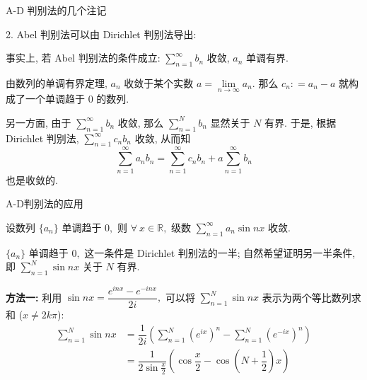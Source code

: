 \begin{frame}{A-D 判别法的几个注记}

2. Abel 判别法可以由 Dirichlet 判别法导出:

\pause
\vspace{0.8em}

事实上, 若 Abel 判别法的条件成立: $\sum\limits_{n=1}^{\infty} b_n$ 收敛, $a_n$ 单调有界. \par
由数列的单调有界定理, $a_n$ 收敛于某个实数 $a = \lim\limits_{n\to\infty} a_n.$ 那么 $c_n : = a_n - a$ 就构成了一个单调趋于 $0$ 的数列.

\pause
\vspace{0.8em}

另一方面, 由于 $\sum\limits_{n=1}^{\infty} b_n$ 收敛, 那么 $\sum\limits_{n=1}^{N} b_n$ 显然关于 $N$ 有界. 于是, 根据 Dirichlet 判别法, $\sum\limits_{n=1}^{\infty} c_nb_n$ 收敛, 从而知
\[\sum\limits_{n=1}^{\infty} a_nb_n = \sum\limits_{n=1}^{\infty} c_nb_n + a \sum\limits_{n=1}^{\infty} b_n\]
也是收敛的.

\end{frame}


\begin{frame}{A-D判别法的应用}

\begin{eg}
设数列 $\{a_n\}$ 单调趋于 $0,$ 则 $\forall~x \in \mathbb{R},$ 级数 $\sum\limits_{n=1}^\infty a_n \sin nx$ 收敛.
\end{eg}

\pause
\vspace{0.4em}

\startproof[bg=yellow, fg=red]
$\{a_n\}$ 单调趋于 $0,$ 这一条件是 Dirichlet 判别法的一半; 自然希望证明另一半条件, 即 $\sum\limits_{n=1}^N \sin nx$ 关于 $N$ 有界.

\pause

\textbf{方法一:} 利用 $\sin nx = \dfrac{e^{inx} - e^{-inx}}{2i},$ 可以将 $\sum\limits_{n=1}^N \sin nx$ 表示为两个等比数列求和 ($x \neq 2k\pi$):
\begin{align*}
\sum\limits_{n=1}^N \sin nx & = \dfrac{1}{2i} \left( \sum\limits_{n=1}^N \left(e^{ix}\right)^n - \sum\limits_{n=1}^N \left(e^{-ix}\right)^n \right) \\
& = \dfrac{1}{2\sin\frac{x}{2}} \left( \cos\dfrac{x}{2} - \cos \left(N + \dfrac{1}{2}\right) x \right)
\end{align*}

\end{frame}

